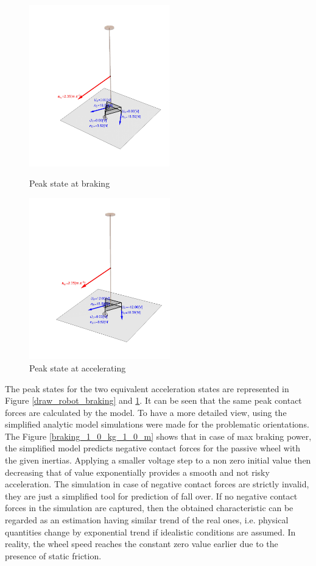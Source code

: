\documentclass[12pt,english]{article}
\begin{document}
\begin{figure}[htb!]
	\centering
	\includegraphics[height=7cm]{figures/draw_robot_baking}
	\caption{Peak state at braking}
	\label{draw_robot_braking}
	\endminipage\hfill
	\centering
	\includegraphics[height=7cm]{figures/draw_robot_accelerating}
	\caption{Peak state at accelerating}
	\label{draw_robot_accelerate}
	\endminipage\hfill
\end{figure}
The peak states for the two equivalent acceleration states are represented in Figure \ref{draw_robot_braking} and \ref{draw_robot_accelerate}. It can be seen that the same peak contact forces are calculated by the model. To have a more detailed view, using the simplified analytic model simulations were made for the problematic orientations.
The Figure \ref{braking_1_0_kg_1_0_m} shows that in case of max braking power, the simplified model predicts negative contact forces for the passive wheel with the given inertias. Applying a smaller voltage step to a non zero initial value then decreasing that of value exponentially provides a smooth and not risky acceleration. The simulation in case of negative contact forces are strictly invalid, they are just a simplified tool for prediction of fall over. If no negative contact forces in the simulation are captured, then the obtained characteristic can be regarded as an estimation having similar trend of the real ones, i.e. physical quantities change by exponential trend if idealistic conditions are assumed. In reality, the wheel speed reaches the constant zero value earlier due to the presence of static friction.
\end{document}
